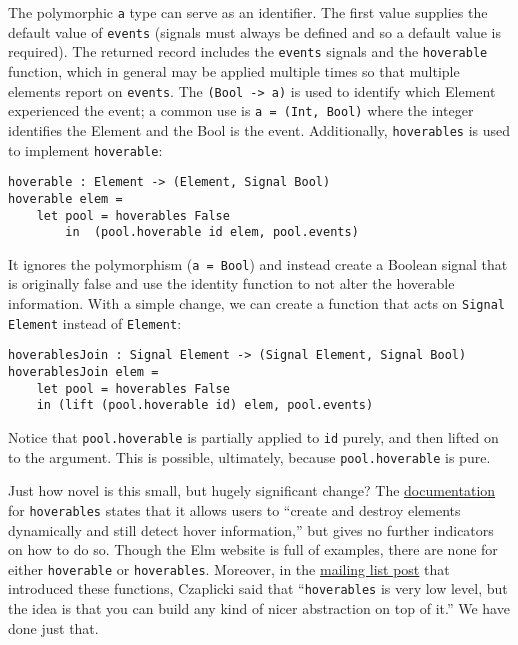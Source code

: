 \documentclass{article}
\begin{document}
The polymorphic \texttt{a} type can serve as an identifier. The first
value supplies the default value of \texttt{events} (signals must always
be defined and so a default value is required). The returned record
includes the \texttt{events} signals and the \texttt{hoverable}
function, which in general may be applied multiple times so that
multiple elements report on \texttt{events}. The
\texttt{(Bool -\textgreater{} a)} is used to identify which Element
experienced the event; a common use is \texttt{a = (Int, Bool)} where
the integer identifies the Element and the Bool is the event.
Additionally, \texttt{hoverables} is used to implement
\texttt{hoverable}:

\begin{verbatim}
hoverable : Element -> (Element, Signal Bool)
hoverable elem =
    let pool = hoverables False
        in  (pool.hoverable id elem, pool.events)
\end{verbatim}

It ignores the polymorphism (\texttt{a = Bool}) and instead create a
Boolean signal that is originally false and use the identity function to
not alter the hoverable information. With a simple change, we can create
a function that acts on \texttt{Signal Element} instead of
\texttt{Element}:

\begin{verbatim}
hoverablesJoin : Signal Element -> (Signal Element, Signal Bool)
hoverablesJoin elem =
    let pool = hoverables False
    in (lift (pool.hoverable id) elem, pool.events)
\end{verbatim}

Notice that \texttt{pool.hoverable} is partially applied to \texttt{id}
purely, and then lifted on to the argument. This is possible,
ultimately, because \texttt{pool.hoverable} is pure.

Just how novel is this small, but hugely significant change? The
\href{http://docs.elm-lang.org/library/Graphics/Input.elm\#hoverables}{documentation}
for \texttt{hoverables} states that it allows users to ``create and
destroy elements dynamically and still detect hover information,'' but
gives no further indicators on how to do so. Though the Elm website is
full of examples, there are none for either \texttt{hoverable} or
\texttt{hoverables}. Moreover, in the
\href{https://groups.google.com/d/msg/elm-discuss/QgowLy5jdhA/CZQfjkbjMsEJ}{mailing
list post} that introduced these functions, Czaplicki said that
``\texttt{hoverables} is very low level, but the idea is that you can
build any kind of nicer abstraction on top of it.'' We have done just
that.
\end{document}
